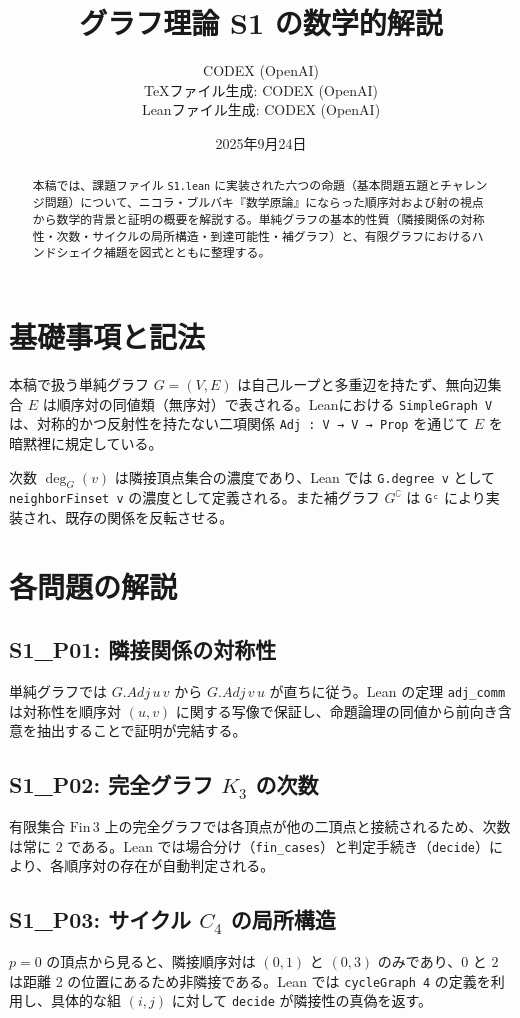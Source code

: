 \documentclass[a4paper]{ltjsarticle}
\title{グラフ理論 S1 の数学的解説}
\author{CODEX (OpenAI)\\TeXファイル生成: CODEX (OpenAI)\\Leanファイル生成: CODEX (OpenAI)}
\date{2025年9月24日}
\theoremstyle{definition}
\theoremstyle{plain}
\begin{document}
\maketitle

\begin{abstract}
本稿では、課題ファイル \texttt{S1.lean} に実装された六つの命題（基本問題五題とチャレンジ問題）について、ニコラ・ブルバキ『数学原論』にならった順序対および射の視点から数学的背景と証明の概要を解説する。単純グラフの基本的性質（隣接関係の対称性・次数・サイクルの局所構造・到達可能性・補グラフ）と、有限グラフにおけるハンドシェイク補題を図式とともに整理する。
\end{abstract}

\section{基礎事項と記法}
本稿で扱う単純グラフ $G=(V,E)$ は自己ループと多重辺を持たず、無向辺集合 $E$ は順序対の同値類（無序対）で表される。Leanにおける \verb|SimpleGraph V| は、対称的かつ反射性を持たない二項関係 \verb|Adj : V → V → Prop| を通じて $E$ を暗黙裡に規定している。

次数 $\deg_G(v)$ は隣接頂点集合の濃度であり、Lean では \verb|G.degree v| として \verb|neighborFinset v| の濃度として定義される。また補グラフ $G^{\complement}$ は \verb|Gᶜ| により実装され、既存の関係を反転させる。

\section{各問題の解説}
\subsection*{S1\_P01: 隣接関係の対称性}
単純グラフでは $G.Adj\,u\,v$ から $G.Adj\,v\,u$ が直ちに従う。Lean の定理 \verb|adj_comm| は対称性を順序対 $(u,v)$ に関する写像で保証し、命題論理の同値から前向き含意を抽出することで証明が完結する。

\subsection*{S1\_P02: 完全グラフ $K_3$ の次数}
有限集合 $\mathrm{Fin}\,3$ 上の完全グラフでは各頂点が他の二頂点と接続されるため、次数は常に $2$ である。Lean では場合分け（\verb|fin_cases|）と判定手続き（\verb|decide|）により、各順序対の存在が自動判定される。

\subsection*{S1\_P03: サイクル $C_4$ の局所構造}
$p=0$ の頂点から見ると、隣接順序対は $(0,1)$ と $(0,3)$ のみであり、$0$ と $2$ は距離 2 の位置にあるため非隣接である。Lean では \verb|cycleGraph 4| の定義を利用し、具体的な組 $(i,j)$ に対して \verb|decide| が隣接性の真偽を返す。
\end{document}
